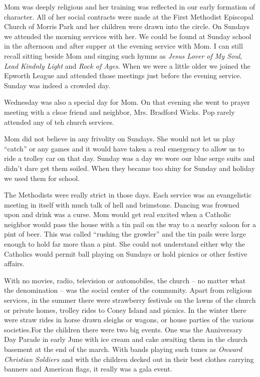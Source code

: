 \documentclass[12pt]{book}              %
\begin{document}
Mom was deeply religious and her training was reflected in our early formation of character. All of her social contracts were made at the First Methodist Episcopal Church of Morris Park and her children were drawn into the circle. On Sundays we attended the morning services with her. We could be found at Sunday school in the afternoon and after supper at the evening service with Mom. I can still recall sitting beside Mom and singing such hymns as {\it Jesus Lover of My Soul}, {\it Lead Kindnly Light} and {\it Rock of Ages}. When we were a little older we joined the Epworth League and attended those meetings just before the evening service. Sunday was indeed a crowded day. 

Wednesday was also a special day for Mom. On that evening she went to prayer meeting with a clsoe friend and neighbor, Mrs. Bradford Wicks. Pop rarely attended any of teh church services. 

Mom did not believe in any frivolity on Sundays. She would not let us play ``catch'' or any games and it would have taken a real emergency to allow us to ride a trolley car on that day. Sunday was a day we wore our blue serge suits and didn't dare get them soiled. When they became too shiny for Sunday and holiday we used them for school. 

The Methodists were really strict in those days. Each service was an evangelistic meeting in itself with much talk of hell and brimstone. Dancing was frowned upon and drink was a curse. Mom would get real excited when a Catholic neighbor would pass the house with a tin pail on the way to a nearby saloon for a pint of beer. This was called ``rushing the growler'' and the tin pails were large enough to hold far more than a pint. She could not understand either why the Catholics would permit ball playing on Sundays or hold picnics or other festive affairs. 

With no movies, radio, television or automobiles, the church -- no matter what the denomination -- was the social center of the community. Apart from religious services, in the summer there were strawberry festivals on the lawns of the church or private homes, trolley rides to Coney Island and picnics. In the winter there were straw rides in horse drawn sleighs or wagons, or house parties of the various societies.For the children there were two big events. One was the Anniversary Day Parade in early June with ice cream and cake awaiting them in the church basement at the end of the march. With bands playing such tunes as {\it Onward Christian Soldiers} and with the children decked out in their best clothes carrying banners and American flags, it really was a gala event. 
\end{document}
